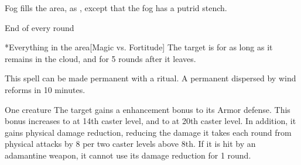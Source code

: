 \begin{spellheader}
    \spelldur{\durshort}
\end{spellheader}
\begin{spelleffects}
    \spelleffect Fog fills the area, as , except that the fog has a putrid stench.
    \begin{spelltrigger}{End of every round}
        \begin{spelltarget}*{Everything in the area}[Magic vs. Fortitude]
            \spellsuccess The target is \sickened for as long as it remains in the cloud, and for 5 rounds after it leaves.
        \end{spelltarget}
    \end{spelltrigger}
\end{spelleffects}
\begin{spellfooter}
    \spellnotes This spell can be made permanent with a  ritual. A permanent  dispersed by wind reforms in 10 minutes. \fogspellnotes \fogwindspellnotes
\end{spellfooter}

\begin{spellheader}
    \spelldur{\durshort}
\end{spellheader}
\begin{spelleffects}
    \begin{spelltarget}{One creature}
        \spelleffect The target gains a  enhancement bonus to its Armor defense. This bonus increases to  at 14th caster level, and to  at 20th caster level. In addition, it gains physical damage reduction, reducing the damage it takes each round from physical attacks by 8  per two caster levels above 8th. If it is hit by an adamantine weapon, it cannot use its damage reduction for 1 round.
    \end{spelltarget}
\end{spelleffects}
\begin{spellfooter}
    
\end{spellfooter}

